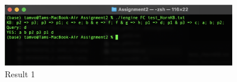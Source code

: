 \documentclass{assignment}
\begin{document}
                                                                                                                                                                                                                                                                                                                                                                                                                                                                                                                                                                                                                                                                                                                                                                                                                                                                                                                                                                                                                                                                                                                                                                                                                                                                                                                                                                                                                                                                                                                                                                                                                                                                                                                                                                                                                                                                                                                                                                                                                                                                                                                                                                                                                                                                                                                                                                                                                                                                                                                                                             \begin{figure}[h]
    \centering
    \includegraphics[width=0.9\textwidth]{./assets/test_HornKB_FC.png}
    \caption{Result 1}
    \label{fig:fig5}
\end{figure}
\end{document}
